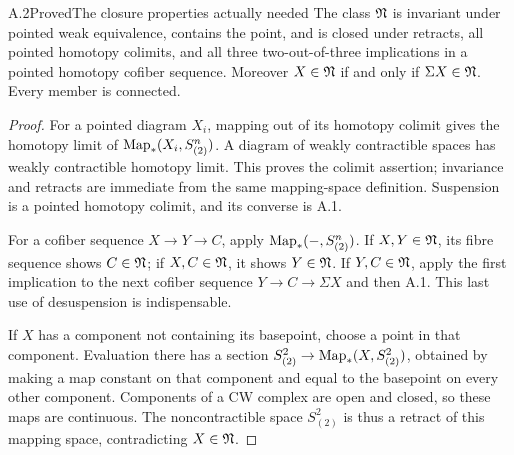 \begin{claim}{A.2}{Proved}{The closure properties actually needed}\label{A2}
The class $\mathfrak N$ is invariant under pointed weak equivalence, contains the point, and is closed under retracts, all pointed homotopy colimits, and all three two-out-of-three implications in a pointed homotopy cofiber sequence. Moreover $X\in\mathfrak N$ if and only if $\Sigma X\in\mathfrak N$. Every member is connected.
\end{claim}
\begin{proof}
For a pointed diagram $X_i$, mapping out of its homotopy colimit gives the homotopy limit of $\operatorname{Map}_*(X_i,S^n_{(2)})$. A diagram of weakly contractible spaces has weakly contractible homotopy limit. This proves the colimit assertion; invariance and retracts are immediate from the same mapping-space definition. Suspension is a pointed homotopy colimit, and its converse is A.1.

For a cofiber sequence $X\to Y\to C$, apply $\operatorname{Map}_*(-,S^n_{(2)})$. If $X,Y\in\mathfrak N$, its fibre sequence shows $C\in\mathfrak N$; if $X,C\in\mathfrak N$, it shows $Y\in\mathfrak N$. If $Y,C\in\mathfrak N$, apply the first implication to the next cofiber sequence $Y\to C\to\Sigma X$ and then A.1. This last use of desuspension is indispensable.

If $X$ has a component not containing its basepoint, choose a point in that component. Evaluation there has a section $S^2_{(2)}\to\operatorname{Map}_*(X,S^2_{(2)})$, obtained by making a map constant on that component and equal to the basepoint on every other component. Components of a CW complex are open and closed, so these maps are continuous. The noncontractible space $S^2_{(2)}$ is thus a retract of this mapping space, contradicting $X\in\mathfrak N$.
\end{proof}

